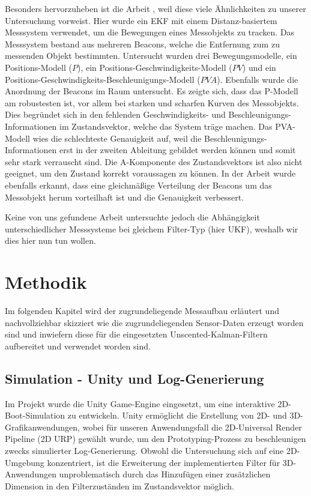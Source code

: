 \documentclass[conference]{IEEEtran}[10pt]
\begin{document}
Besonders hervorzuheben ist die Arbeit \cite{khan2014localization}, weil diese viele Ähnlichkeiten zu unserer Untersuchung vorweist. Hier wurde ein EKF mit einem Distanz-basiertem Messsystem verwendet, um die Bewegungen eines Messobjekts zu tracken. Das Messsystem bestand aus mehreren Beacons, welche die Entfernung zum zu messenden Objekt bestimmten. Untersucht wurden drei Bewegungsmodelle, ein Positions-Modell (\(P\)), ein Positions-Geschwindigkeits-Modell (\(PV\)) und ein Positions-Geschwindigkeits-Beschleunigungs-Modell (\(PVA\)). Ebenfalls wurde die Anordnung der Beacons im Raum untersucht. Es zeigte sich, dass das P-Modell am robustesten ist, vor allem bei starken und scharfen Kurven des Messobjekts. Dies begründet sich in den fehlenden Geschwindigkeits- und Beschleunigungs-Informationen im Zustandsvektor, welche das System träge machen. Das PVA-Modell wies die schlechteste Genauigkeit auf, weil die Beschleunigungs-Informationen erst in der zweiten Ableitung gebildet werden können und somit sehr stark verrauscht sind. Die A-Komponente des Zustandsvektors ist also nicht geeignet, um den Zustand korrekt voraussagen zu können. In der Arbeit wurde ebenfalls erkannt, dass eine gleichmäßige Verteilung der Beacons um das Messobjekt herum vorteilhaft ist und die Genauigkeit verbessert.

Keine von uns gefundene Arbeit untersuchte jedoch die Abhängigkeit unterschiedlicher Messsysteme bei gleichem Filter-Typ (hier UKF), weshalb wir dies hier nun tun wollen.


\section{Methodik}

Im folgenden Kapitel wird der zugrundeliegende Messaufbau erläutert und nachvollziehbar skizziert wie die zugrundeliegenden Sensor-Daten erzeugt worden sind und inwiefern diese für die eingesetzten Unscented-Kalman-Filtern aufbereitet und verwendet worden sind. 

\subsection{Simulation - Unity und Log-Generierung}

Im Projekt wurde die Unity Game-Engine  eingesetzt, um eine interaktive 2D-Boot-Simulation zu entwickeln. Unity ermöglicht die Erstellung von 2D- und 3D-Grafikanwendungen, wobei für unseren Anwendungsfall die 2D-Universal Render Pipeline (2D URP) gewählt wurde, um den Prototyping-Prozess zu beschleunigen zwecks simulierter Log-Generierung. Obwohl die Untersuchung sich auf eine 2D-Umgebung konzentriert, ist die Erweiterung der implementierten Filter für 3D-Anwendungen unproblematisch durch das Hinzufügen einer zusätzlichen Dimension in den Filterzuständen im Zustandsvektor möglich.
\end{document}
